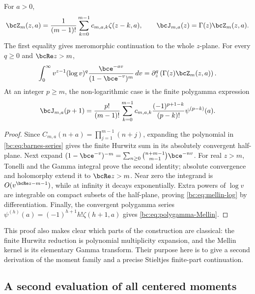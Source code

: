 \begin{proposition}
\label{bc:prop:mellin}
For $a>0$,
\begin{equation}\label{bc:eq:finite-hurwitz}
 \bcZ_m(z,a)=\frac1{(m-1)!}
                 \sum_{k=0}^{m-1}c_{m,a,k}\zeta(z-k,a),
 \qquad
 \bcJ_{m,a}(z)=\Gamma(z)\bcZ_m(z,a).
\end{equation}
The first equality gives meromorphic continuation to the whole
$z$-plane. For every $q\ge0$ and $\bcRe z>m$,
\begin{equation}\label{bc:eq:mellin-log}
 \int_0^\infty v^{z-1}(\log v)^q
              \frac{\bce^{-av}}{(1-\bce^{-v})^m}\,dv
 =\partial_z^q\left(\Gamma(z)\bcZ_m(z,a)\right).
\end{equation}
At an integer $p\ge m$, the non-logarithmic case is the finite
polygamma expression
\begin{equation}\label{bc:eq:polygamma-Mellin}
 \bcJ_{m,a}(p+1)=\frac{p!}{(m-1)!}
       \sum_{k=0}^{m-1}c_{m,a,k}
            \frac{(-1)^{p+1-k}}{(p-k)!}\psi^{(p-k)}(a).
\end{equation}
\end{proposition}
\begin{proof}
Since $C_{m,a}(n+a)=\prod_{j=1}^{m-1}(n+j)$, expanding the polynomial
in \eqref{bc:eq:barnes-series} gives the finite Hurwitz sum in its
absolutely convergent half-plane. Next expand
$(1-\bce^{-v})^{-m}=\sum_{n\ge0}\binom{n+m-1}{m-1}\bce^{-nv}$.
For real $z>m$, Tonelli and the Gamma integral prove the second identity;
absolute convergence and holomorphy extend it to $\bcRe z>m$.
Near zero the integrand is $O(v^{\bcRe z-m-1})$, while at infinity
it decays exponentially. Extra powers of $\log v$ are integrable on
compact subsets of the half-plane, proving
\eqref{bc:eq:mellin-log} by differentiation. Finally, the convergent
polygamma series
$\psi^{(h)}(a)=(-1)^{h+1}h!\zeta(h+1,a)$ gives
\eqref{bc:eq:polygamma-Mellin}.
\end{proof}

This proof also makes clear which parts of the construction are
classical: the finite Hurwitz reduction is polynomial multiplicity
expansion, and the Mellin kernel is its elementary Gamma transform.
Their purpose here is to give a second derivation of the moment family
and a precise Stieltjes finite-part continuation.

\subsection{A second evaluation of all centered moments}


